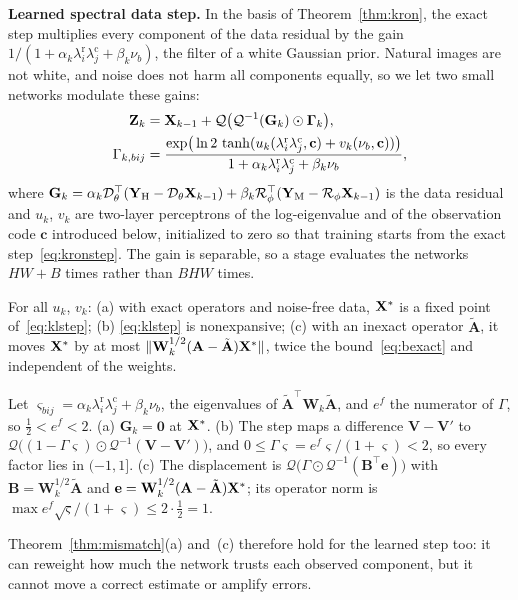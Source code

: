 \documentclass[journal]{IEEEtran}
\begin{document}
\textbf{Learned spectral data step.} In the basis of Theorem~\ref{thm:kron}, the exact step multiplies every component of the data residual by the gain $1/(1+\alpha_k\lambda^{\mathrm{r}}_i\lambda^{\mathrm{c}}_j+\beta_k\nu_b)$, the filter of a white Gaussian prior. Natural images are not white, and noise does not harm all components equally, so we let two small networks modulate these gains:
\begin{equation}
\begin{split}
\mathbf{Z}_k&=\mathbf{X}_{k-1}+\mathcal{Q}\big(\mathcal{Q}^{-1}(\mathbf{G}_k)\odot\boldsymbol{\Gamma}_k\big),\\
\Gamma_{k,bij}&=\frac{\exp\!\big(\ln2\,\tanh(u_k(\lambda^{\mathrm{r}}_i\lambda^{\mathrm{c}}_j,\mathbf{c})+v_k(\nu_b,\mathbf{c}))\big)}{1+\alpha_k\lambda^{\mathrm{r}}_i\lambda^{\mathrm{c}}_j+\beta_k\nu_b},
\end{split}
\label{eq:klstep}
\end{equation}
where $\mathbf{G}_k=\alpha_k\mathcal{D}_\theta^{\top}(\mathbf{Y}_{\mathrm{H}}-\mathcal{D}_\theta\mathbf{X}_{k-1})+\beta_k\mathcal{R}_\phi^{\top}(\mathbf{Y}_{\mathrm{M}}-\mathcal{R}_\phi\mathbf{X}_{k-1})$ is the data residual and $u_k$, $v_k$ are two-layer perceptrons of the log-eigenvalue and of the observation code $\mathbf{c}$ introduced below, initialized to zero so that training starts from the exact step~\eqref{eq:kronstep}. The gain is separable, so a stage evaluates the networks $HW+B$ times rather than $BHW$ times.
\begin{proposition}
\label{prop:kl}
For all $u_k$, $v_k$: (a) with exact operators and noise-free data, $\mathbf{X}^*$ is a fixed point of~\eqref{eq:klstep}; (b) \eqref{eq:klstep} is nonexpansive; (c) with an inexact operator $\tilde{\mathbf{A}}$, it moves $\mathbf{X}^*$ by at most $\|\mathbf{W}_k^{1/2}(\mathbf{A}-\tilde{\mathbf{A}})\mathbf{X}^*\|$, twice the bound~\eqref{eq:bexact} and independent of the weights.
\end{proposition}
\begin{IEEEproof}
Let $\varsigma_{bij}=\alpha_k\lambda^{\mathrm{r}}_i\lambda^{\mathrm{c}}_j+\beta_k\nu_b$, the eigenvalues of $\tilde{\mathbf{A}}^{\top}\mathbf{W}_k\tilde{\mathbf{A}}$, and $e^{f}$ the numerator of $\Gamma$, so $\tfrac12<e^{f}<2$. (a) $\mathbf{G}_k=\mathbf{0}$ at $\mathbf{X}^*$. (b) The step maps a difference $\mathbf{V}-\mathbf{V}'$ to $\mathcal{Q}\big((1-\Gamma\varsigma)\odot\mathcal{Q}^{-1}(\mathbf{V}-\mathbf{V}')\big)$, and $0\le\Gamma\varsigma=e^{f}\varsigma/(1+\varsigma)<2$, so every factor lies in $(-1,1]$. (c) The displacement is $\mathcal{Q}\big(\Gamma\odot\mathcal{Q}^{-1}(\mathbf{B}^{\top}\mathbf{e})\big)$ with $\mathbf{B}=\mathbf{W}_k^{1/2}\tilde{\mathbf{A}}$ and $\mathbf{e}=\mathbf{W}_k^{1/2}(\mathbf{A}-\tilde{\mathbf{A}})\mathbf{X}^*$; its operator norm is $\max e^{f}\sqrt{\varsigma}/(1+\varsigma)\le2\cdot\tfrac12=1$.
\end{IEEEproof}
Theorem~\ref{thm:mismatch}(a) and~(c) therefore hold for the learned step too: it can reweight how much the network trusts each observed component, but it cannot move a correct estimate or amplify errors.
\end{document}
